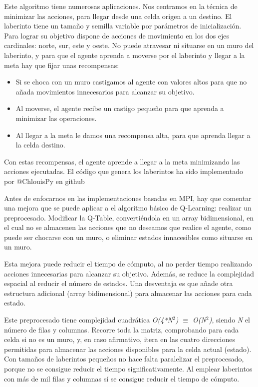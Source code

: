 		Este algoritmo tiene numerosas aplicaciones. Nos centramos en la técnica de minimizar las acciones, para llegar desde una celda origen a un destino. El laberinto tiene un tamaño y semilla variable por parámetros de inicialización. Para lograr su objetivo dispone de acciones de movimiento en los dos ejes cardinales: norte, sur, este y oeste. No puede atravesar ni situarse en un muro del laberinto, y para que el agente aprenda a moverse por el laberinto y llegar a la meta hay que fijar unas recompensas:
		\begin{itemize}
			\item Si se choca con un muro castigamos al agente con valores altos para que no añada movimientos innecesarios para alcanzar su objetivo.
			\vspace*{-0.2cm}
			\item Al moverse, el agente recibe un castigo pequeño para que aprenda a minimizar las operaciones.
			\vspace*{-0.2cm}
			\item Al llegar a la meta le damos una recompensa alta, para que aprenda llegar a la celda destino. 					
		\end{itemize}
	
		Con estas recompensas, el agente aprende a llegar a la meta minimizando las acciones ejecutadas. El código que genera los laberintos ha sido implementado por @ChlouisPy en github\cite{MazeGenerator}


		Antes de enfocarnos en las implementaciones basadas en MPI, hay que comentar una mejora que se puede aplicar a el algoritmo básico de Q-Learning: realizar un preprocesado. Modificar la Q-Table, convertiéndola en un array bidimensional, en el cual no se almacenen las acciones que no deseamos que realice el agente, como puede ser chocarse con un muro, o eliminar estados innacesibles como situarse en un muro.
		
		Esta mejora puede reducir el tiempo de cómputo, al no perder tiempo realizando acciones innecesarias para alcanzar su objetivo. Además, se reduce la complejidad espacial al reducir el número de estados. Una desventaja es que añade otra estructura adicional (array bidimensional) para almacenar las acciones para cada estado. 
		
		Este preprocesado tiene complejidad cuadrática \textit{O(4*N\(^{2}\)) $\equiv$ O(N\(^{2}\))}, siendo \textit{N} el número de filas y columnas. Recorre toda la matriz, comprobando para cada celda si no es un muro, y, en caso afirmativo, itera en las cuatro direcciones permitidas para almacenar las acciones disponibles para la celda actual (estado). Con tamaños de laberintos pequeños no hace falta paralelizar el preprocesado, porque no se consigue reducir el tiempo significativamente. Al emplear laberintos con más de mil filas y columnas sí se consigue reducir el tiempo de cómputo.
		
